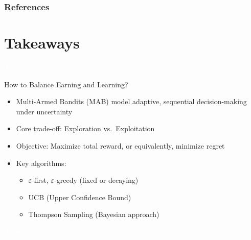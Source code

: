 \documentclass[11pt,table]{beamer}
\begin{document}
\begin{frame}[t,allowframebreaks
]%
\frametitle{References}
\small

\end{frame}



\section{Takeaways}
{
\begin{frame}
\centering
\Huge
\textcolor{white}{Takeaways}
\thispagestyle{empty}
\end{frame}
}

\begin{frame}{How to Balance Earning and Learning?}
\begin{itemize}
    \item Multi-Armed Bandits (MAB) model adaptive, sequential decision-making under uncertainty
    \item Core trade-off: Exploration vs.\ Exploitation
    \item Objective: Maximize total reward, or equivalently, minimize regret
    \item Key algorithms:
    \begin{itemize}
        \item \(\varepsilon\)-first, \(\varepsilon\)-greedy (fixed or decaying)
        \item UCB (Upper Confidence Bound)
        \item Thompson Sampling (Bayesian approach)
    \end{itemize}
\end{itemize}
\end{frame}


\appendix
{
\begin{frame}
\centering
\Huge
\textcolor{white}{Appendix}
\thispagestyle{empty}
\end{frame}
}
\end{document}
